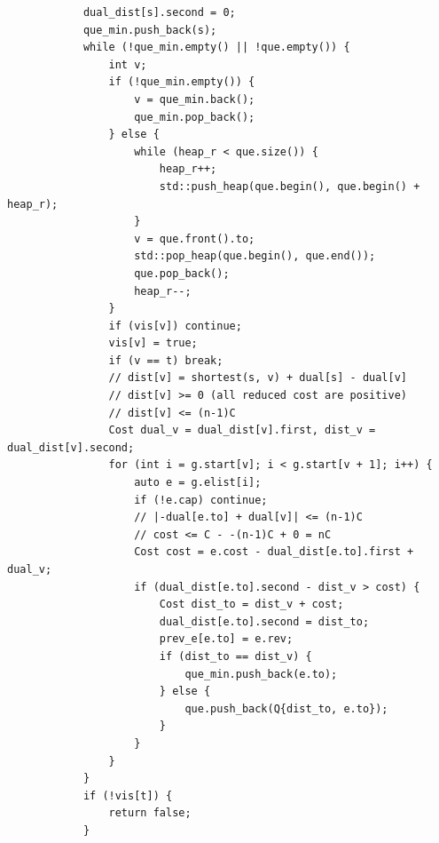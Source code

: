 \documentclass[UTF8]{article}
\begin{document}
\begin{verbatim}
            dual_dist[s].second = 0;
            que_min.push_back(s);
            while (!que_min.empty() || !que.empty()) {
                int v;
                if (!que_min.empty()) {
                    v = que_min.back();
                    que_min.pop_back();
                } else {
                    while (heap_r < que.size()) {
                        heap_r++;
                        std::push_heap(que.begin(), que.begin() + heap_r);
                    }
                    v = que.front().to;
                    std::pop_heap(que.begin(), que.end());
                    que.pop_back();
                    heap_r--;
                }
                if (vis[v]) continue;
                vis[v] = true;
                if (v == t) break;
                // dist[v] = shortest(s, v) + dual[s] - dual[v]
                // dist[v] >= 0 (all reduced cost are positive)
                // dist[v] <= (n-1)C
                Cost dual_v = dual_dist[v].first, dist_v = dual_dist[v].second;
                for (int i = g.start[v]; i < g.start[v + 1]; i++) {
                    auto e = g.elist[i];
                    if (!e.cap) continue;
                    // |-dual[e.to] + dual[v]| <= (n-1)C
                    // cost <= C - -(n-1)C + 0 = nC
                    Cost cost = e.cost - dual_dist[e.to].first + dual_v;
                    if (dual_dist[e.to].second - dist_v > cost) {
                        Cost dist_to = dist_v + cost;
                        dual_dist[e.to].second = dist_to;
                        prev_e[e.to] = e.rev;
                        if (dist_to == dist_v) {
                            que_min.push_back(e.to);
                        } else {
                            que.push_back(Q{dist_to, e.to});
                        }
                    }
                }
            }
            if (!vis[t]) {
                return false;
            }


\end{verbatim}
\end{document}

